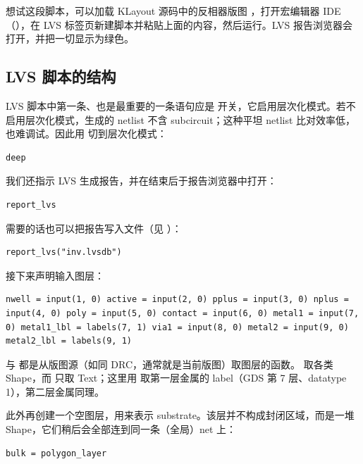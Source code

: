 想试这段脚本，可以加载 KLayout 源码中的反相器版图 ，打开宏编辑器 IDE（），在 LVS 标签页新建脚本并粘贴上面的内容，然后运行。LVS 报告浏览器会打开，并把一切显示为绿色。


\subsection{LVS 脚本的结构}

LVS 脚本中第一条、也是最重要的一条语句应是  开关，它启用层次化模式。若不启用层次化模式，生成的 netlist 不含 subcircuit；这种平坦 netlist 比对效率低，也难调试。因此用  切到层次化模式：

\begin{lstlisting}
deep
\end{lstlisting}

我们还指示 LVS 生成报告，并在结束后于报告浏览器中打开：

\begin{lstlisting}
report_lvs
\end{lstlisting}

需要的话也可以把报告写入文件（见 ）：

\begin{lstlisting}
report_lvs("inv.lvsdb")
\end{lstlisting}

接下来声明输入图层：

\begin{lstlisting}
nwell = input(1, 0) active = input(2, 0) pplus = input(3, 0) nplus = input(4, 0) poly = input(5, 0) contact = input(6, 0) metal1 = input(7, 0) metal1_lbl = labels(7, 1) via1 = input(8, 0) metal2 = input(9, 0) metal2_lbl = labels(9, 1)
\end{lstlisting}

 与  都是从版图源（如同 DRC，通常就是当前版图）取图层的函数。 取各类 Shape，而  只取 Text；这里用  取第一层金属的 label（GDS 第 7 层、datatype 1），第二层金属同理。

此外再创建一个空图层，用来表示 substrate。该层并不构成封闭区域，而是一堆 Shape，它们稍后会全部连到同一条（全局）net 上：

\begin{lstlisting}
bulk = polygon_layer
\end{lstlisting}

